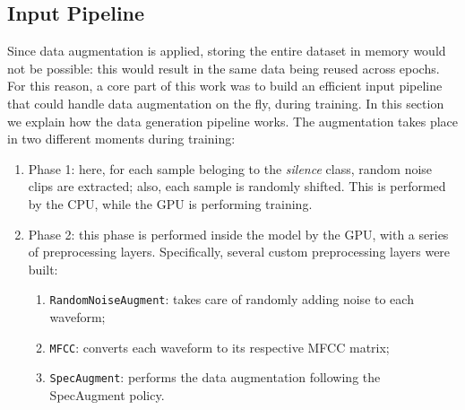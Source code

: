 \subsection{Input Pipeline}
\label{sec:processing_architecture}
Since data augmentation is applied, storing the entire dataset in memory would not be possible: this would result in the same data being reused across epochs. For this reason, a core part of this work was to build an efficient input pipeline that could handle data augmentation on the fly, during training. In this section we explain how the data generation pipeline works. The augmentation takes place in two different moments during training: 
\begin{enumerate}
	\item Phase 1: here, for each sample beloging to the \textit{silence} class, random noise clips are extracted; also, each sample is randomly shifted. This is performed by the CPU, while the GPU is performing training. 
	\item Phase 2: this phase is performed inside the model by the GPU, with a series of preprocessing layers. Specifically, several custom preprocessing layers were built:
	\begin{enumerate}
		\item \verb|RandomNoiseAugment|: takes care of randomly adding noise to each waveform;
		\item \verb|MFCC|: converts each waveform to its respective MFCC matrix;
		\item \verb|SpecAugment|: performs the data augmentation following the SpecAugment policy.
	\end{enumerate}
\end{enumerate}

